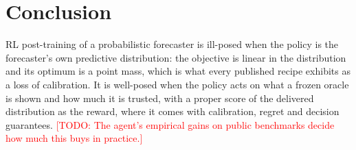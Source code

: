\documentclass{article}
\newcommand{\todo}[1]{\textcolor{red}{[TODO: #1]}}
\begin{document}
\section{Conclusion}
RL post-training of a probabilistic forecaster is ill-posed when the policy is the forecaster's own predictive distribution: the objective is linear in the distribution and its optimum is a point mass, which is what every published recipe exhibits as a loss of calibration. It is well-posed when the policy acts on what a frozen oracle is shown and how much it is trusted, with a proper score of the delivered distribution as the reward, where it comes with calibration, regret and decision guarantees. \todo{The agent's empirical gains on public benchmarks decide how much this buys in practice.}




\appendix
\end{document}
